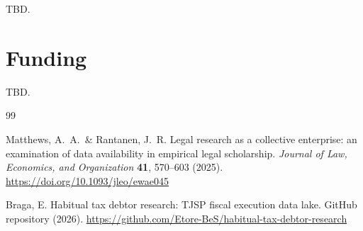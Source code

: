 \documentclass[11pt,a4paper]{article}
\begin{document}
TBD.

\section*{Funding}

TBD.

\begin{thebibliography}{99}

Matthews, A.~A.\ \& Rantanen, J.~R.
Legal research as a collective enterprise: an examination of data availability in empirical legal scholarship.
\emph{Journal of Law, Economics, and Organization} \textbf{41}, 570--603 (2025).
\url{https://doi.org/10.1093/jleo/ewae045}

Braga, E.
Habitual tax debtor research: TJSP fiscal execution data lake.
GitHub repository (2026).
\url{https://github.com/Etore-BeS/habitual-tax-debtor-research}

\end{thebibliography}
\end{document}
